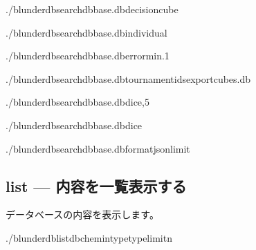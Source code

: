 \documentclass[letterpaper,10pt,dvipdfmx]{sphinxmanual}
\begin{document}
\sphinxAtStartPar
{}

\begin{sphinxVerbatim}[commandchars=\\\{\}]
./blunderdbsearch\PYGZhy{}\PYGZhy{}dbbase.db\PYGZhy{}\PYGZhy{}decisioncube

./blunderdbsearch\PYGZhy{}\PYGZhy{}dbbase.db\PYGZhy{}\PYGZhy{}individual

./blunderdbsearch\PYGZhy{}\PYGZhy{}dbbase.db\PYGZhy{}\PYGZhy{}error\PYGZhy{}min.1

./blunderdbsearch\PYGZhy{}\PYGZhy{}dbbase.db\PYGZhy{}\PYGZhy{}tournament\PYGZhy{}ids\PYGZhy{}\PYGZhy{}exportcubes.db

./blunderdbsearch\PYGZhy{}\PYGZhy{}dbbase.db\PYGZhy{}\PYGZhy{}dice,5

./blunderdbsearch\PYGZhy{}\PYGZhy{}dbbase.db\PYGZhy{}\PYGZhy{}dice

./blunderdbsearch\PYGZhy{}\PYGZhy{}dbbase.db\PYGZhy{}\PYGZhy{}formatjson\PYGZhy{}\PYGZhy{}limit
\end{sphinxVerbatim}


\subsection{list — 内容を一覧表示する}
\label{\detokenize{cli:list-lister-le-contenu}}
\sphinxAtStartPar
データベースの内容を表示します。

\begin{sphinxVerbatim}[commandchars=\\\{\}]
./blunderdblist\PYGZhy{}\PYGZhy{}db\PYGZlt{}chemin\PYGZgt{}\PYGZhy{}\PYGZhy{}type\PYGZlt{}type\PYGZgt{}\PYG{o}{[}\PYGZhy{}\PYGZhy{}limit\PYGZlt{}n\PYGZgt{}\PYG{o}{]}
\end{sphinxVerbatim}
\end{document}
